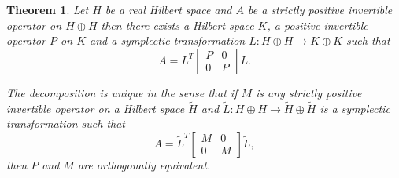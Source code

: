 \documentclass[12pt,a4paper,twoside]{article}
\numberwithin{equation}{section}
\theoremstyle{definition}  %
\theoremstyle{plain}  %
\newtheorem{thm}[defn]{Theorem}
\theoremstyle{remark} %
\begin{document}
\begin{thm}\label{sec:will-norm-form}
  Let $H$ be a real Hilbert space and $A$ be a strictly positive invertible operator on $H\oplus H$ then there exists
a Hilbert space $K$, a positive invertible operator $P$ on $K$ and a symplectic transformation $ L\colon H\oplus H \rightarrow K \oplus K$
 such that   \begin{equation}
    \label{eq:will-norm-form}
    A = L^{T} \begin{bmatrix}
              P & 0  \\
              0 & P
             \end{bmatrix} L.
  \end{equation}

The decomposition is unique in the sense that if $M$ is any strictly positive invertible operator on a Hilbert space $\tilde{H}$ and $\tilde{L}\colon H\oplus H \rightarrow \tilde{H} \oplus \tilde{H}$ is a symplectic transformation such that
 \begin{equation}\label{eq:uniqueness}
    A = \tilde{L}^{T} \begin{bmatrix}
              M & 0  \\
              0 & M
             \end{bmatrix} \tilde{L},
  \end{equation}
then
$P$ and $M$ are orthogonally equivalent.
\end{thm}
\end{document}
